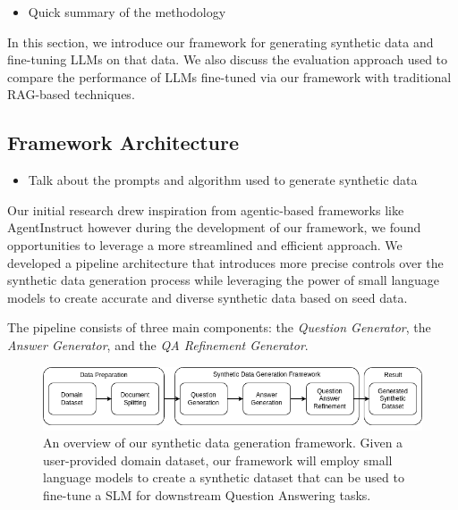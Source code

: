\begin{itemize}
  \item Quick summary of the methodology
\end{itemize}

In this section, we introduce our framework for generating synthetic data and fine-tuning LLMs on that data.
We also discuss the evaluation approach used to compare the performance of LLMs fine-tuned via our framework
with traditional RAG-based techniques.


\subsection{Framework Architecture}
\begin{itemize}
  \item Talk about the prompts and algorithm used to generate synthetic data
\end{itemize}

Our initial research drew inspiration from agentic-based frameworks like AgentInstruct %
however during the development of our framework, we found opportunities to leverage a more streamlined and efficient approach.
We developed a pipeline architecture that introduces more precise controls over the
synthetic data generation process while leveraging the power of small language models to create accurate
and diverse synthetic data based on seed data.

The pipeline consists of three main components: the \textit{Question Generator}, the \textit{Answer Generator}, and the \textit{QA Refinement Generator}.

\begin{figure}[h]
  \centering
  \includegraphics[width=\textwidth]{methodology-overview.png}
  \caption{An overview of our synthetic data generation framework. Given a user-provided domain dataset, our
framework will employ small language models to create a synthetic dataset that can be used
to fine-tune a SLM for downstream Question Answering tasks.}
\end{figure}

